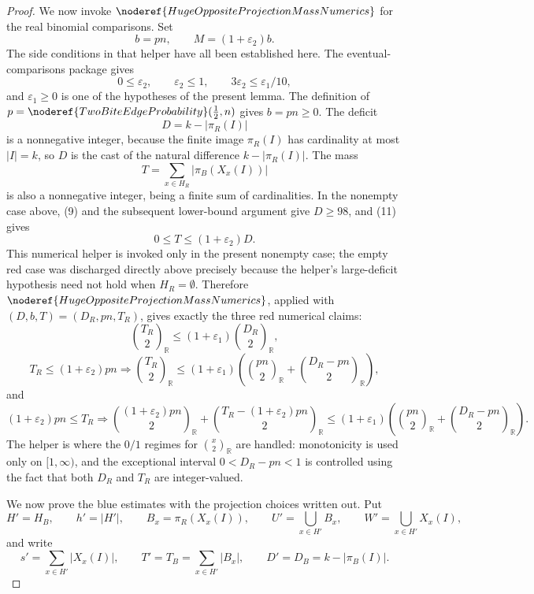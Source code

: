 \begin{proof}
We now invoke \(\noderef{HugeOppositeProjectionMassNumerics}\) for the real
binomial comparisons.  Set
\[
b=pn,\qquad M=(1+\varepsilon_2)b.
\]
The side conditions in that helper have all been established here.  The
eventual-comparisons package gives
\[
0\le\varepsilon_2,\qquad \varepsilon_2\le1,\qquad
3\varepsilon_2\le\varepsilon_1/10,
\]
and \(\varepsilon_1\ge0\) is one of the hypotheses of the present lemma.  The
definition of \(p=\noderef{TwoBiteEdgeProbability}(\frac12,n)\) gives
\(b=pn\ge0\).  The deficit
\[
D=k-|\pi_R(I)|
\]
is a nonnegative integer, because the finite image \(\pi_R(I)\) has
cardinality at most \(|I|=k\), so \(D\) is the cast of the natural difference
\(k-|\pi_R(I)|\).  The mass
\[
T=\sum_{x\in H_R}|\pi_B(X_x(I))|
\]
is also a nonnegative integer, being a finite sum of cardinalities.  In the
nonempty case above, (9) and the subsequent lower-bound argument give
\(D\ge98\), and (11) gives
\[
0\le T\le(1+\varepsilon_2)D.
\]
This numerical helper is invoked only in the present nonempty case; the
empty red case was discharged directly above precisely because the helper's
large-deficit hypothesis need not hold when \(H_R=\emptyset\).  Therefore
\(\noderef{HugeOppositeProjectionMassNumerics}\), applied with
\((D,b,T)=(D_R,pn,T_R)\), gives exactly the three red numerical claims:
\[
\binom{T_R}{2}_{\mathbb R}
\le
(1+\varepsilon_1)\binom{D_R}{2}_{\mathbb R},
\]
\[
T_R\le(1+\varepsilon_2)pn\Longrightarrow
\binom{T_R}{2}_{\mathbb R}
\le
(1+\varepsilon_1)\left(
\binom{pn}{2}_{\mathbb R}+\binom{D_R-pn}{2}_{\mathbb R}\right),
\]
and
\[
(1+\varepsilon_2)pn\le T_R\Longrightarrow
\binom{(1+\varepsilon_2)pn}{2}_{\mathbb R}
+\binom{T_R-(1+\varepsilon_2)pn}{2}_{\mathbb R}
\le
(1+\varepsilon_1)\left(
\binom{pn}{2}_{\mathbb R}+\binom{D_R-pn}{2}_{\mathbb R}\right).
\]
The helper is where the \(0/1\) regimes for
\(\binom{x}{2}_{\mathbb R}\) are handled: monotonicity is used only on
\([1,\infty)\), and the exceptional interval \(0<D_R-pn<1\) is controlled
using the fact that both \(D_R\) and \(T_R\) are integer-valued.

We now prove the blue estimates with the projection choices written out.  Put
\[
H'=H_B,\qquad h'=|H'|,\qquad
B_x=\pi_R(X_x(I)),\qquad
U'=\bigcup_{x\in H'}B_x,\qquad
W'=\bigcup_{x\in H'}X_x(I),
\]
and write
\[
s'=\sum_{x\in H'}|X_x(I)|,\qquad
T'=T_B=\sum_{x\in H'}|B_x|,\qquad
D'=D_B=k-|\pi_B(I)|.
\]


\end{proof}

